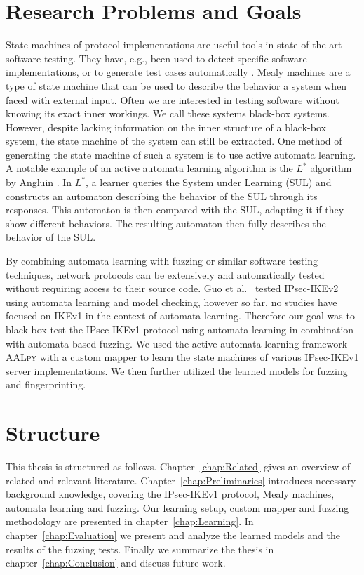 \section{Research Problems and Goals}
State machines of protocol implementations are useful tools in state-of-the-art software testing. They have, e.g., been used to detect specific software implementations, or to generate test cases automatically \parencites{pferscher2021fingerprinting, pferscher2022fuzzing}. Mealy machines are a type of state machine that can be used to describe the behavior a system when faced with external input. Often we are interested in testing software without knowing its exact inner workings. We call these systems black-box systems. However, despite lacking information on the inner structure of a black-box system, the state machine of the system can still be extracted. One method of generating the state machine of such a system is to use active automata learning. A notable example of an active automata learning algorithm is the $L^*$ algorithm by Angluin \parencite{angluin1987learning}. In $L^*$, a learner queries the System under Learning (SUL) and constructs an automaton describing the behavior of the SUL through its responses. This automaton is then compared with the SUL, adapting it if they show different behaviors. The resulting automaton then fully describes the behavior of the SUL.

By combining automata learning with fuzzing or similar software testing techniques, network protocols can be extensively and automatically tested without requiring access to their source code. Guo et al.~\parencite{guo2019model} tested IPsec-IKEv2 using automata learning and model checking, however so far, no studies have focused on IKEv1 in the context of automata learning. Therefore our goal was to black-box test the IPsec-IKEv1 protocol using automata learning in combination with automata-based fuzzing. We used the active automata learning framework \textsc{AALpy} \parencite{muvskardin2022aalpy} with a custom mapper to learn the state machines of various IPsec-IKEv1 server implementations. We then further utilized the learned models for fuzzing and fingerprinting. %

\section{Structure}
This thesis is structured as follows. Chapter~\ref{chap:Related} gives an overview of related and relevant literature. Chapter~\ref{chap:Preliminaries} introduces necessary background knowledge, covering the IPsec-IKEv1 protocol, Mealy machines, automata learning and fuzzing. Our learning setup, custom mapper and fuzzing methodology are presented in chapter~\ref{chap:Learning}. In chapter~\ref{chap:Evaluation} we present and analyze the learned models and the results of the fuzzing tests.
Finally we summarize the thesis in chapter~\ref{chap:Conclusion} and discuss future work.